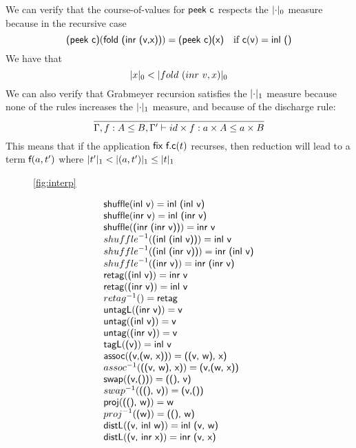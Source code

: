 \documentclass[a4paper,UKenglish,cleveref, autoref, thm-restate]{lipics-v2021}
\newcommand\mycomment[1]{}
\begin{document}
We can verify that the course-of-values for $\textsf{peek c}$ respects the $\zerom{\cdot}$ measure because in the recursive case \[\textsf{(peek c)}(\textsf{fold (inr (v,x))})=\textsf{(peek c)(x)}\quad \text{if }\textsf{c}(\textsf{v})=\textsf{inl ()}\]
We have that 
\[ \zerom{x} < \zerom{fold~ (inr~ v,x)}\]
We can also verify that Grabmeyer recursion satisfies the $\onem{\cdot}$ measure because none of the rules increases the $\onem{\cdot}$ measure, and because of the discharge rule:
\[\infer{\contains{\Gamma, f : A \leq B, \Gamma'}{id \times f}{a \times A}{a \times B}}{}\]
This means that if the application $\textsf{fix f.c}(t)$ recurses, then reduction will lead to a term $\textsf{f}(a,t')$ where $\onem{t'} < \onem{(a,t')}\leq \onem{t}$
\begin{figure} \ref{fig:interp}
\mycomment{Check rules are correct}
\mycomment{mention fold/unfold isorecursion 1.3 notation and terminology}
  \centering
  \begin{displaymath}
    \begin{array}{l}
\irule{shuffle}{inl v}{inl (inl v)}\\
\irule{shuffle}{inr v}{inl (inr v)}\\
\irule{shuffle}{(inr (inr v))}{inr v}\\
\iruleinv{shuffle}{(inl (inl v))}{inl v}\\
\iruleinv{shuffle}{(inl (inr v))}{inr (inl v)}\\
\iruleinv{shuffle}{(inr v)}{inr (inr v)}\\
\irule{retag}{(inl v)}{inr v}\\
\irule{retag}{(inr v)}{inl v}\\
\iruleinv{retag}{}{retag}\\
\irule{untagL}{(inr v)}{v}\\
\irule{untag}{(inl v)}{v}\\
\irule{untag}{(inr v)}{v}\\
\irule{tagL}{(v)}{inl v}\\ 
\irule{assoc}{(v,(w, x))}{((v, w), x)}\\
\iruleinv{assoc}{((v, w), x)}{(v,(w, x))}\\
\irule{swap}{(v,())}{((), v)}\\
\iruleinv{swap}{((), v)}{(v,())}\\
\irule{proj}{((), w)}{w}\\
\iruleinv{proj}{(w)}{((), w)}\\
\irule{distL}{(v, inl w)}{inl (v, w)}\\
\irule{distL}{(v, inr x)}{inr (v, x)}\\

\end{array}
\end{displaymath}
\end{figure}
\end{document}
